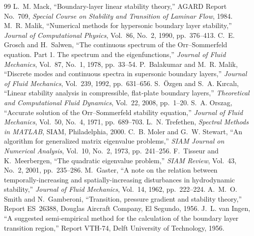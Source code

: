 \documentclass[11pt]{article}
\begin{document}
\begin{thebibliography}{99}
 L.~M. Mack, ``Boundary-layer linear stability theory,'' AGARD Report No.~709,
  \emph{Special Course on Stability and Transition of Laminar Flow}, 1984.
 M.~R. Malik, ``Numerical methods for hypersonic boundary layer stability,''
  \emph{Journal of Computational Physics}, Vol.~86, No.~2, 1990, pp.~376--413.
 C.~E. Grosch and H.~Salwen, ``The continuous spectrum of the Orr--Sommerfeld
  equation. Part 1. The spectrum and the eigenfunctions,'' \emph{Journal of Fluid Mechanics},
  Vol.~87, No.~1, 1978, pp.~33--54.
 P.~Balakumar and M.~R. Malik, ``Discrete modes and continuous spectra in
  supersonic boundary layers,'' \emph{Journal of Fluid Mechanics}, Vol.~239, 1992, pp.~631--656.
 S.~\"Ozgen and S.~A. K{\i}rcal{\i}, ``Linear stability analysis in compressible,
  flat-plate boundary layers,'' \emph{Theoretical and Computational Fluid Dynamics}, Vol.~22, 2008,
  pp.~1--20.
 S.~A. Orszag, ``Accurate solution of the Orr--Sommerfeld stability equation,''
  \emph{Journal of Fluid Mechanics}, Vol.~50, No.~4, 1971, pp.~689--703.
 L.~N. Trefethen, \emph{Spectral Methods in MATLAB}, SIAM, Philadelphia, 2000.
 C.~B. Moler and G.~W. Stewart, ``An algorithm for generalized matrix
  eigenvalue problems,'' \emph{SIAM Journal on Numerical Analysis}, Vol.~10, No.~2, 1973,
  pp.~241--256.
 F.~Tisseur and K.~Meerbergen, ``The quadratic eigenvalue problem,''
  \emph{SIAM Review}, Vol.~43, No.~2, 2001, pp.~235--286.
 M.~Gaster, ``A note on the relation between temporally-increasing and
  spatially-increasing disturbances in hydrodynamic stability,'' \emph{Journal of Fluid Mechanics},
  Vol.~14, 1962, pp.~222--224.
 A.~M.~O. Smith and N.~Gamberoni, ``Transition, pressure gradient and stability
  theory,'' Report ES~26388, Douglas Aircraft Company, El Segundo, 1956.
 J.~L. van Ingen, ``A suggested semi-empirical method for the calculation of
  the boundary layer transition region,'' Report VTH-74, Delft University of Technology, 1956.
\end{thebibliography}
\end{document}
